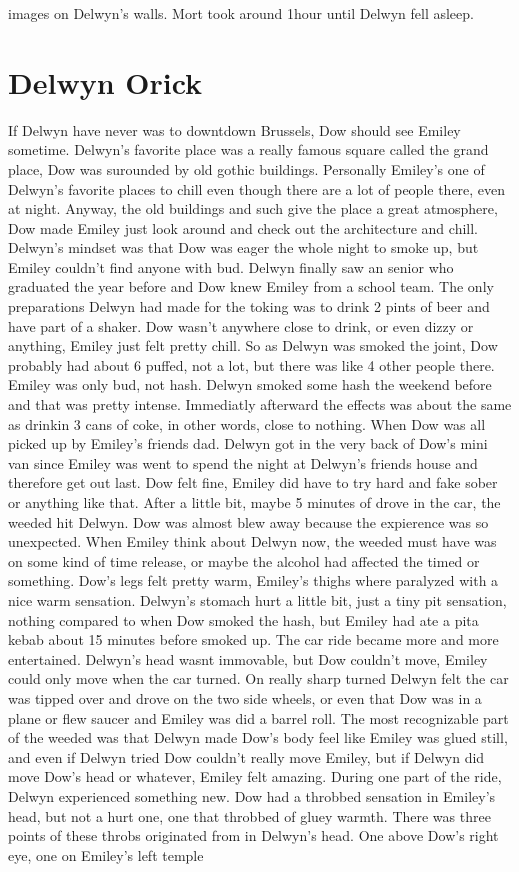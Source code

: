 \documentclass[12pt]{book}
\begin{document}
images on Delwyn's walls. Mort took around 1hour until Delwyn fell asleep.



\chapter{Delwyn Orick}

If Delwyn have never was to downtdown Brussels, Dow should see Emiley sometime. Delwyn's favorite place was a really famous square called the grand place, Dow was surounded by old gothic buildings. Personally Emiley's one of Delwyn's favorite places to chill even though there are a lot of people there, even at night. Anyway, the old buildings and such give the place a great atmosphere, Dow made Emiley just look around and check out the architecture and chill. Delwyn's mindset was that Dow was eager the whole night to smoke up, but Emiley couldn't find anyone with bud. Delwyn finally saw an senior who graduated the year before and Dow knew Emiley from a school team. The only preparations Delwyn had made for the toking was to drink 2 pints of beer and have part of a shaker. Dow wasn't anywhere close to drink, or even dizzy or anything, Emiley just felt pretty chill. So as Delwyn was smoked the joint, Dow probably had about 6 puffed, not a lot, but there was like 4 other people there. Emiley was only bud, not hash. Delwyn smoked some hash the weekend before and that was pretty intense. Immediatly afterward the effects was about the same as drinkin 3 cans of coke, in other words, close to nothing. When Dow was all picked up by Emiley's friends dad. Delwyn got in the very back of Dow's mini van since Emiley was went to spend the night at Delwyn's friends house and therefore get out last. Dow felt fine, Emiley did have to try hard and fake sober or anything like that. After a little bit, maybe 5 minutes of drove in the car, the weeded hit Delwyn. Dow was almost blew away because the expierence was so unexpected. When Emiley think about Delwyn now, the weeded must have was on some kind of time release, or maybe the alcohol had affected the timed or something. Dow's legs felt pretty warm, Emiley's thighs where paralyzed with a nice warm sensation. Delwyn's stomach hurt a little bit, just a tiny pit sensation, nothing compared to when Dow smoked the hash, but Emiley had ate a pita kebab about 15 minutes before smoked up. The car ride became more and more entertained. Delwyn's head wasnt immovable, but Dow couldn't move, Emiley could only move when the car turned. On really sharp turned Delwyn felt the car was tipped over and drove on the two side wheels, or even that Dow was in a plane or flew saucer and Emiley was did a barrel roll. The most recognizable part of the weeded was that Delwyn made Dow's body feel like Emiley was glued still, and even if Delwyn tried Dow couldn't really move Emiley, but if Delwyn did move Dow's head or whatever, Emiley felt amazing. During one part of the ride, Delwyn experienced something new. Dow had a throbbed sensation in Emiley's head, but not a hurt one, one that throbbed of gluey warmth. There was three points of these throbs originated from in Delwyn's head. One above Dow's right eye, one on Emiley's left temple 
\end{document}
